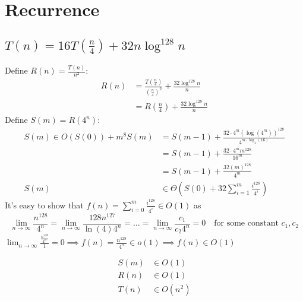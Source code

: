 \documentclass{article}
\begin{document}
\section{Recurrence}

\subsection{$T(n) = 16T(\frac{n}{4}) + 32n\log^{128}n$}
Define $R(n) = \frac{T(n)}{n^2}$:
\begin{align*}
    R(n) &= \frac{T(\frac{n}{4})}{(\frac{n}{4})^2} + \frac{32\log^{128}n}{n}\\
    &= R(\frac{n}{4}) + \frac{32\log^{128}n}{n}
\end{align*}
Define $S(m) = R(4^n)$:
\begin{align*}S(m) \in O(S(0)) + m^8
    S(m) &= S(m - 1) + \frac{32 \cdot 4^m (\log(4^m))^{128}}{4^{m \cdot \log_4(16)}}\\
    &= S(m -1) + \frac{32\cdot 4^m m^{128}}{16^m}\\
    &= S(m-1) + \frac{32(m)^{128}}{4^m}\\
    S(m) &\in \Theta(S(0) + 32\sum_{i=1}^{m} \frac{i^{128}}{4^i})
\end{align*}
It's easy to show that $f(n) = \sum_{i=0}^{m}\frac{i^{128}}{4^i} \in O(1)$ as 
\[\lim_{n\rightarrow \infty} \frac{n^{128}}{4^n} = \lim_{n\rightarrow \infty} \frac{128 n^{127}}{\ln(4) 4^n} 
= \dots = \lim_{n \rightarrow \infty} \frac{c_1 }{c_2 4^n} = 0\quad \text{for some constant } c_1, c_2\]
$\lim_{n \rightarrow \infty} \frac{\frac{n^{128}}{4^n}}{1} = 0 \implies f(n) = \frac{n^{128}}{4^n} \in o(1) \implies f(n) \in O(1)$

\begin{align*}
    S(m) &\in O(1)\\
    R(n) &\in O(1)\\
    T(n) &\in O(n^2)
\end{align*}
\end{document}
